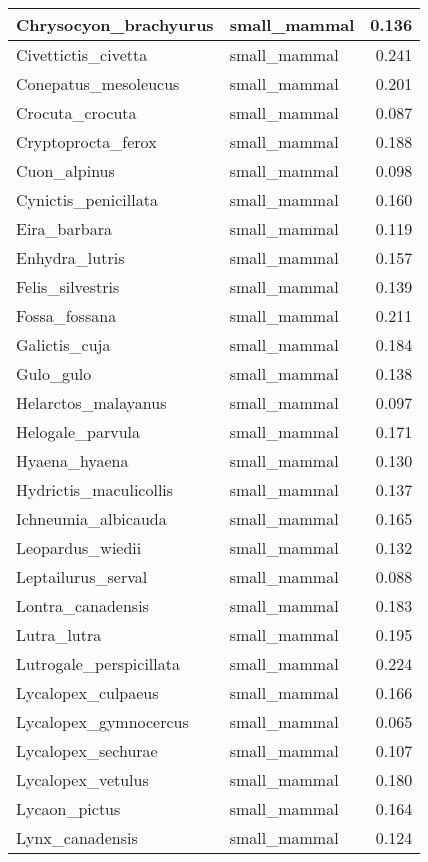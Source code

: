 \begin{table}
\begin{tabular}[t]{l|l|r}
Chrysocyon\_brachyurus & small\_mammal & 0.136\\
\hline
Civettictis\_civetta & small\_mammal & 0.241\\
\hline
Conepatus\_mesoleucus & small\_mammal & 0.201\\
\hline
Crocuta\_crocuta & small\_mammal & 0.087\\
\hline
Cryptoprocta\_ferox & small\_mammal & 0.188\\
\hline
Cuon\_alpinus & small\_mammal & 0.098\\
\hline
Cynictis\_penicillata & small\_mammal & 0.160\\
\hline
Eira\_barbara & small\_mammal & 0.119\\
\hline
Enhydra\_lutris & small\_mammal & 0.157\\
\hline
Felis\_silvestris & small\_mammal & 0.139\\
\hline
Fossa\_fossana & small\_mammal & 0.211\\
\hline
Galictis\_cuja & small\_mammal & 0.184\\
\hline
Gulo\_gulo & small\_mammal & 0.138\\
\hline
Helarctos\_malayanus & small\_mammal & 0.097\\
\hline
Helogale\_parvula & small\_mammal & 0.171\\
\hline
Hyaena\_hyaena & small\_mammal & 0.130\\
\hline
Hydrictis\_maculicollis & small\_mammal & 0.137\\
\hline
Ichneumia\_albicauda & small\_mammal & 0.165\\
\hline
Leopardus\_wiedii & small\_mammal & 0.132\\
\hline
Leptailurus\_serval & small\_mammal & 0.088\\
\hline
Lontra\_canadensis & small\_mammal & 0.183\\
\hline
Lutra\_lutra & small\_mammal & 0.195\\
\hline
Lutrogale\_perspicillata & small\_mammal & 0.224\\
\hline
Lycalopex\_culpaeus & small\_mammal & 0.166\\
\hline
Lycalopex\_gymnocercus & small\_mammal & 0.065\\
\hline
Lycalopex\_sechurae & small\_mammal & 0.107\\
\hline
Lycalopex\_vetulus & small\_mammal & 0.180\\
\hline
Lycaon\_pictus & small\_mammal & 0.164\\
\hline
Lynx\_canadensis & small\_mammal & 0.124\\

\end{tabular}
\end{table}
